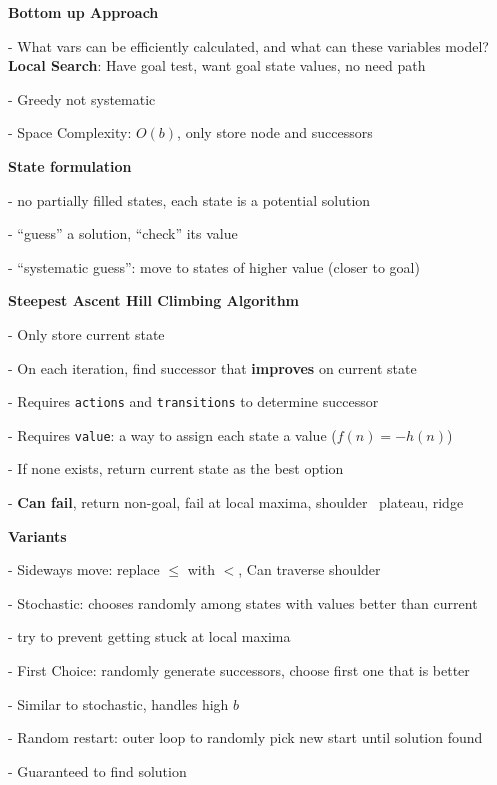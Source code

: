 \documentclass[10pt, a4paper]{article}
\newcommand{\highlight}[1]{{\color{red}\textbf{#1}}}
\newcommand{\red}[1]{{\color{red}#1}}
\newcommand{\green}[1]{{\color{PineGreen}#1}}
\newcommand{\header}[1]{{\normalsize\textbf{#1}}}
\newcommand{\tab}[0]{\hspace*{2mm}}
\begin{document}
\begin{multicols*}{3}
		\textbf{Bottom up Approach}

		- What vars can be efficiently calculated, and what can these variables model?\\

		\header{Local Search}: Have goal test, want goal state values, no need path

		- Greedy \red{not} systematic

		- Space Complexity: $O(b)$, only store node and successors

		\textbf{State formulation}

		- no partially filled states, each state is a potential solution

		- ``guess'' a solution, ``check'' its value

		- ``systematic guess'': move to states of higher value (closer to goal)

		\textbf{Steepest Ascent Hill Climbing Algorithm}


		- Only store current state

		- On each iteration, find successor that \textbf{improves} on current state

		\tab - Requires \red{\texttt{actions}} and \red{\texttt{transitions}} to determine successor

		\tab - Requires \red{\texttt{value}}: a way to assign each state a value ($f(n) = -h(n)$)

		- If none exists, return current state as the best option

		- \highlight{Can fail}, return non-goal, fail at \red{local maxima, shoulder \ plateau, ridge}

		\textbf{Variants}

		- Sideways move: replace $\leq$ with $<$, \green{Can traverse shoulder}

		- Stochastic: chooses randomly among states with values better than current

		\tab -\green{ try to prevent getting stuck at local maxima }

		- First Choice: randomly generate successors, choose first one that is better

		\tab - \green{Similar to stochastic, handles high $b$}

		- Random restart: outer loop to randomly pick new start until solution found

		\tab - \green{Guaranteed to find solution}


\end{multicols*}
\end{document}
